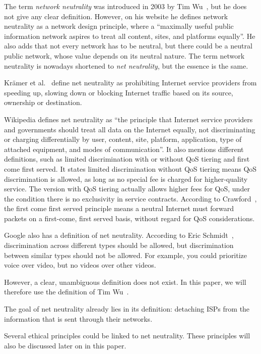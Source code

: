 
The term \emph{network neutrality} was introduced in 2003 by Tim Wu~\cite{wu2003network}, but he does not give any clear definition. However, on his website \highlight{[cite]} he defines network neutrality as a network design principle, where a ``maximally useful public information network aspires to treat all content, sites, and platforms equally''. He also adds that not every network has to be neutral, but there could be a neutral public network, whose value depends on its neutral nature. The term network neutrality is nowadays shortened to \emph{net neutrality}, but the essence is the same.

Kr\"amer et al.~\cite{kramer2013net} define net neutrality as prohibiting Internet service providers from speeding up, slowing down or blocking Internet traffic based on its source, ownership or destination.

Wikipedia \highlight{[cite]} defines net neutrality as ``the principle that Internet service providers and governments should treat all data on the Internet equally, not discriminating or charging differentially by user, content, site, platform, application, type of attached equipment, and modes of communication''. It also mentions different definitions, such as limited discrimination with or without \ac{QoS} tiering and first come first served. It states limited discrimination without \ac{QoS} tiering means \ac{QoS} discrimination is allowed, as long as no special fee is charged for higher-quality service. The version with \ac{QoS} tiering actually allows higher fees for \ac{QoS}, under the condition there is no exclusivity in service contracts. According to Crawford~\highlight{[cite]}, the first come first served principle means a neutral Internet must forward packets on a first-come, first served basis, without regard for \ac{QoS} considerations.

Google also has a definition of net neutrality. According to Eric Schmidt~\highlight{[cite]}, discrimination across different types should be allowed, but discrimination between similar types should not be allowed. For example, you could prioritize voice over video, but no videos over other videos.

However, a clear, unambiguous definition does not exist. In this paper, we will therefore use the definition of Tim Wu~\highlight{[cite]}.

The goal of net neutrality already lies in its definition: detaching \acp{ISP} from the information that is sent through their networks.

Several ethical principles could be linked to net neutrality. These principles will also be discussed later on in this paper.

